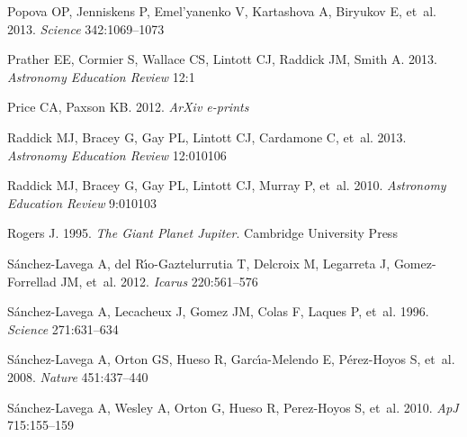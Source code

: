 \documentclass{ar2e}
\begin{document}
\begin{thebibliography}{}
{Popova} OP, {Jenniskens} P, {Emel'yanenko} V, {Kartashova} A, {Biryukov} E,
  et~al. 2013.
\newblock \textit{Science} 342:1069--1073

{Prather} EE, {Cormier} S, {Wallace} CS, {Lintott} CJ, {Raddick} JM, {Smith} A.
  2013.
\newblock \textit{{Astronomy Education Review}} 12:1

{Price} CA, {Paxson} KB. 2012.
\newblock \textit{ArXiv e-prints}

{Raddick} MJ, {Bracey} G, {Gay} PL, {Lintott} CJ, {Cardamone} C, et~al. 2013.
\newblock \textit{Astronomy Education Review} 12:010106

{Raddick} MJ, {Bracey} G, {Gay} PL, {Lintott} CJ, {Murray} P, et~al. 2010.
\newblock \textit{Astronomy Education Review} 9:010103

Rogers J. 1995.
\newblock \textit{{The Giant Planet Jupiter}}.
\newblock Cambridge University Press

{S{\'a}nchez-Lavega} A, {del R{\'{\i}}o-Gaztelurrutia} T, {Delcroix} M,
  {Legarreta} J, {Gomez-Forrellad} JM, et~al. 2012.
\newblock \textit{Icarus} 220:561--576

{S{\'a}nchez-Lavega} A, {Lecacheux} J, {Gomez} JM, {Colas} F, {Laques} P,
  et~al. 1996.
\newblock \textit{Science} 271:631--634

{S{\'a}nchez-Lavega} A, {Orton} GS, {Hueso} R, {Garc{\'{\i}}a-Melendo} E,
  {P{\'e}rez-Hoyos} S, et~al. 2008.
\newblock \textit{Nature} 451:437--440

S{\'a}nchez-Lavega A, Wesley A, Orton G, Hueso R, Perez-Hoyos S, et~al. 2010.
\newblock \textit{ApJ} 715:155--159


\end{thebibliography}
\end{document}
